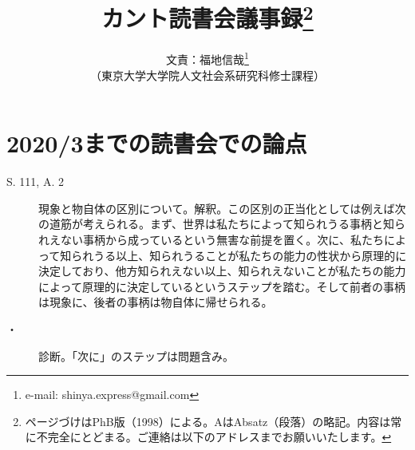 \documentclass[12pt]{jsarticle}
\title{カント読書会議事録\thanks{ページづけはPhB版（1998）による。AはAbsatz（段落）の略記。内容は常に不完全にとどまる。ご連絡は以下のアドレスまでお願いいたします。}}
\author{文責：福地信哉\thanks{e-mail: shinya.express@gmail.com}\\ （東京大学大学院人文社会系研究科修士課程）}
\begin{document}
\maketitle


\section{2020/3までの読書会での論点}
\begin{description}
\item[S. 111, A. 2]現象と物自体の区別について。解釈。この区別の正当化としては例えば次の道筋が考えられる。まず、世界は私たちによって知られうる事柄と知られえない事柄から成っているという無害な前提を置く。次に、私たちによって知られうる以上、知られうることが私たちの能力の性状から原理的に決定しており、他方知られえない以上、知られえないことが私たちの能力によって原理的に決定しているというステップを踏む。そして前者の事柄は現象に、後者の事柄は物自体に帰せられる。
\begin{prooftree}
\end{prooftree}
\item[・]診断。「次に」のステップは問題含み。

\end{description}
\end{document}

